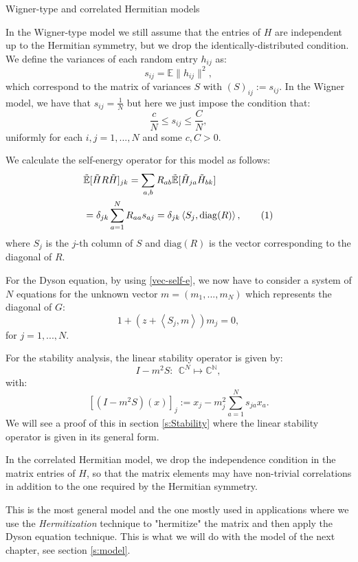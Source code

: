 \documentclass[11pt, a4paper, oneside]{book}
\numberwithin{equation}{chapter}
\newcommand{\E}{\mathbb E}
\newcommand{\beq}{\begin{equation}}
\newcommand{\eeq}{\end{equation}}
\newcommand\numberthis{\addtocounter{equation}{1}\tag{\theequation}}
\begin{document}
\begin{section}{Wigner-type and correlated Hermitian models}
\label{s:W+C}

 In the Wigner-type model we still assume that the entries of $H$ are independent up to the Hermitian symmetry, but we drop the identically-distributed condition. We define the variances of each random entry $h_{ij}$ as:
%
\beq \label{s-var}
s_{ij} = \E\|h_{ij}\|^2,
\eeq
%
which correspond to the matrix of variances $S$ with $(S)_{ij}:=s_{ij}.$ In the Wigner model, we have that $s_{ij} = \frac{1}{N}$ but here we just impose the condition that:
%
\beq \label{s-cond}
\frac{c}{N} \leq s_{ij} \leq \frac{C}{N},
\eeq
uniformly for each $i,j=1,...,N$ and some $c,C>0$.

We calculate the self-energy operator for this model as follows:
\begin{align*} \label{vec-self-e}
&\Tilde{\E}[\Tilde{H} R \Tilde{H}]_{jk} = \sum \limits_{a,b} R_{ab} \tilde{\E} [ \tilde{H}_{ja} \tilde{H}_{bk}] \\
&= \delta_{jk} \sum \limits_{a=1}^N R_{aa} s_{aj} = \delta_{jk} \left \langle S_j , \mathrm{diag}(R) \right \rangle , \numberthis
\end{align*}
%
where $S_j$ is the $j$-th column of $S$ and $\mathrm{diag}(R)$ is the vector corresponding to the diagonal of $R$. 

For the Dyson equation, by using \eqref{vec-self-e}, we now have to consider a system of $N$ equations for the unknown vector $m=(m_1,...,m_N)$ which represents the diagonal of $G$:
%
\beq \label{vec-D}
1 + (z + \left \langle S_j , m \right \rangle ) m_{j} = 0,
\eeq
for $j=1,...,N$.

For the stability analysis, the linear stability operator is given by:
\[ 
I - m^2 S : \ \ \mathbb{C}^N \mapsto \mathbb{C^N},
\]
with:
\beq \label{vec-stab}
\left [ (I - m^2 S)(x) \right ]_j := x_j - m_j^2  \sum \limits_{a=1}^N s_{ja} x_a .
\eeq
%
We will see a proof of this in section \ref{s:Stability} where the linear stability operator is given in its general form.

In the correlated Hermitian model, we drop the independence condition in the matrix entries of $H$, so that the matrix elements may have non-trivial correlations in addition to the one required by the Hermitian symmetry. 

This is the most general model and the one mostly used in applications where we use the \textit{Hermitization} technique to "hermitize" the matrix and then apply the Dyson equation technique. This is what we will do with the model of the next chapter, see section \ref{s:model}.


\end{section}
\end{document}
